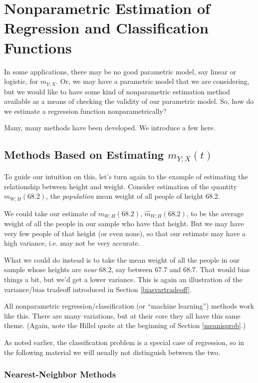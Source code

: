 \section{Nonparametric Estimation of Regression and Classification Functions}
\label{nonpargressest}

In some applications, there may be no good parametric model, say linear
or logistic, for $m_{Y;X}$.  Or, we may have a parametric model that we
are considering, but we would like to have some kind of nonparametric
estimation method available as a means of checking the validity of our
parametric model.  So, how do we estimate a regression function
nonparametrically?

Many, many methods have been developed.  We introduce a few here.

\subsection{Methods Based on Estimating $m_{Y;X}(t)$}

To guide our intuition on this, let's turn again to the example of
estimating the relationship between height and weight.  Consider
estimation of the quantity $m_{W;H}(68.2)$, the {\it population} mean
weight of all people of height 68.2.  

We could take our estimate of $m_{W;H}(68.2)$,
$\widehat{m}_{W;H}(68.2)$,  to be the average weight of all the people
in our sample who have that height.  But we may have very few people of
that height (or even none), so that our estimate may have a high
variance, i.e. may not be very accurate.

What we could do instead is to take the mean weight of all the people in
our sample whose heights are {\it near} 68.2, say between 67.7 and 68.7.
That would bias things a bit, but we'd get a lower variance.  This is
again an illustration of the variance/bias tradeoff introduced in
Section \ref{biasvartradeoff}.

All nonparametric regression/classification (or ``machine learning'')
methods work like this.  There are many variations, but at their core
they all have this same theme.  (Again, note the Hillel quote at the
beginning of Section \ref{meanisprob}.)

As noted earlier, the classification problem is a special case of
regression, so in the following material we will usually not distinguish
between the two.

\subsubsection{Nearest-Neighbor Methods}

